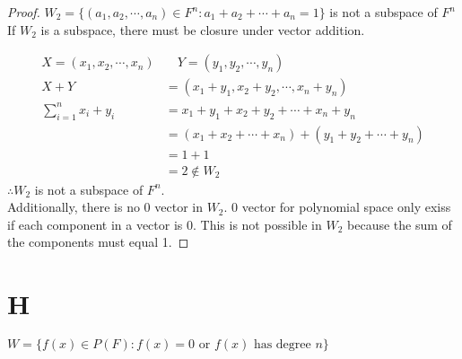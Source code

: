 \documentclass[11pt]{scrartcl}
\makeatletter
\newenvironment{Dequation}
  {%
  \def\tagform@##1{%
    \maketag@@@{\makebox[0pt][r]{(\ignorespaces##1\unskip\@@italiccorr)}}}%
  \ignorespaces
  }
  {%
  \def\tagform@##1{\maketag@@@{(\ignorespaces##1\unskip\@@italiccorr)}}%
  \ignorespacesafterend
  }
\makeatother
\begin{document}
\begin{proof}
$W_2 =\{(a_1, a_2,\cdots,a_n) \in F^n : a_1 + a_2 + \cdots + a_n= 1\}$ is not a subspace of $F^n$\\
If $W_2$ is a subspace, there must be closure under vector addition.
\begin{Dequation}
	\begin{align*}
			X = (x_1, x_2, \cdots, x_n) & \quad Y = (y_1, y_2, \cdots, y_n) \\
			X + Y & = (x_1 + y_1, x_2 + y_2, \cdots, x_n + y_n)\\
			\sum_{i = 1}^{n} x_i + y_i & = x_1 + y_1 + x_2 + y_2 + \cdots + x_n + y_n\\
			& = (x_1 + x_2 + \cdots + x_n) + (y_1 + y_2 + \cdots + y_n)\\
			& = 1 + 1 \\
			& = 2 \notin W_2 
	\end{align*}
\end{Dequation}
$\therefore W_2$ is not a subspace of $F^n$.\\
Additionally, there is no 0 vector in $W_2$. 0 vector for polynomial space only exiss if each component in a vector is 0. This is not possible in $W_2$ because the sum of the components must equal 1. 
\end{proof}

\section{H}
$W = \{f(x) \in P(F) : f(x) = 0 \text{ or } f(x) \text{ has degree } n\}$
\end{document}
